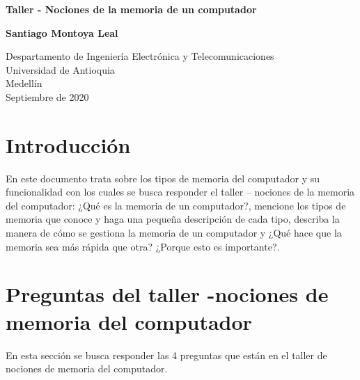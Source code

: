 \documentclass{article}
\begin{document}
\begin{titlepage}
    \begin{center}
        \vspace*{1cm}
            
        \Huge
        \textbf{Taller - Nociones de la memoria de un computador}
            
        \vspace{0.5cm}
        \LARGE
    
            
        \vspace{1.5cm}
            
        \textbf{Santiago Montoya Leal}
            
        \vfill
            
        \vspace{0.8cm}
            
        \Large
        Despartamento de Ingeniería Electrónica y Telecomunicaciones\\
        Universidad de Antioquia\\
        Medellín\\
        Septiembre de 2020
            
    \end{center}
\end{titlepage}

\tableofcontents
\newpage
\section{Introducción}\label{intro}
En este documento trata sobre los tipos de memoria del computador y su funcionalidad con los cuales se busca responder el taller – nociones de la memoria del computador: ¿Qué es la memoria de un computador?, mencione los tipos de memoria que conoce y haga una pequeña descripción de cada tipo, describa la manera de cómo se gestiona la memoria de un computador y ¿Qué hace que la memoria sea más rápida que otra? ¿Porque esto es importante?.

\section{Preguntas del taller -nociones de memoria del computador} \label{contenido}
En esta sección se busca responder las 4 preguntas que están en el taller de nociones de memoria del computador.
\end{document}
